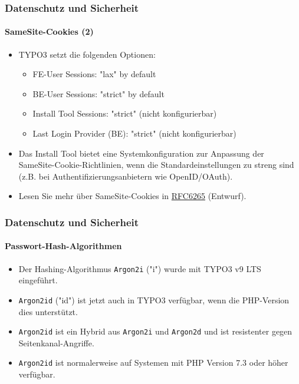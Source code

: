 
\begin{frame}[fragile]
	\frametitle{Datenschutz und Sicherheit}
	\framesubtitle{SameSite-Cookies (2)}

	\begin{itemize}
		\item TYPO3 setzt die folgenden Optionen:

			\begin{itemize}\small
				\item FE-User Sessions: "lax" by default
				\item BE-User Sessions: "strict" by default
				\item Install Tool Sessions: "strict" (nicht konfigurierbar)
				\item Last Login Provider (BE): "strict" (nicht konfigurierbar)
			\end{itemize}\normalsize

		\item Das Install Tool bietet eine Systemkonfiguration zur Anpassung der
			SameSite-Cookie-Richtlinien, wenn die Standardeinstellungen zu streng sind
			(z.B. bei Authentifizierungsanbietern wie OpenID/OAuth).

		\item Lesen Sie mehr über SameSite-Cookies in
			\href{https://tools.ietf.org/html/draft-ietf-httpbis-cookie-same-site-00}{RFC6265} (Entwurf).
	\end{itemize}

\end{frame}


\begin{frame}[fragile]
	\frametitle{Datenschutz und Sicherheit}
	\framesubtitle{Passwort-Hash-Algorithmen}

	\begin{itemize}
		\item Der Hashing-Algorithmus \texttt{Argon2i} ("i") wurde mit TYPO3 v9 LTS eingeführt.
		\item \texttt{Argon2id} ("id") ist jetzt auch in TYPO3 verfügbar, wenn die PHP-Version dies unterstützt.
		\item \texttt{Argon2id} ist ein Hybrid aus \texttt{Argon2i} und \texttt{Argon2d}
			und ist resistenter gegen Seitenkanal-Angriffe.
		\item \texttt{Argon2id} ist normalerweise auf Systemen mit PHP Version 7.3 oder höher verfügbar.
	\end{itemize}

\end{frame}

